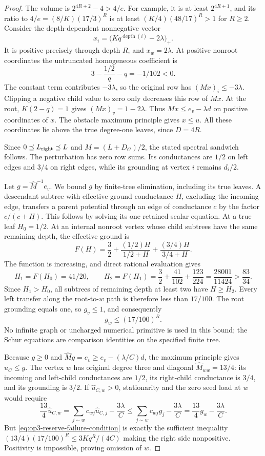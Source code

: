\begin{proof}
The volume is $2^{4R+2}-4>4/e$. For example, it is at least
$2^{4R+1}$, and its ratio to $4/e=(8/K)(17/3)^R$ is at least
$(K/4)(48/17)^R>1$ for $R\geq2$.
Consider the depth-dependent nonnegative vector
\[
 x_i=\bigl(Kq^{\operatorname{depth}(i)}-2\lambda\bigr)_+.
\]
It is positive precisely through depth $R$, and $x_w=2\lambda$.
At positive nonroot coordinates the untruncated homogeneous coefficient is
\[
 3-\frac{1/2}{q}-q=-1/102<0.
\]
The constant term contributes $-3\lambda$, so the original row has
$(Mx)_i\leq-3\lambda$. Clipping a negative child value to zero only
decreases this row of $Mx$. At the root, $K(2-q)=1$ gives
$(Mx)_v=1-2\lambda$. Thus $Mx\leq e_v-\lambda d$ on positive
coordinates of $x$. The obstacle maximum principle gives $x\leq u$.
All these coordinates lie above the true degree-one leaves, since $D=4R$.

Since $0\preceq L_{\rm right}\preceq L$ and
$M=(L+D_G)/2$, the stated spectral sandwich follows. The perturbation
has zero row sums. Its conductances are $1/2$ on left edges and $3/4$
on right edges, while its grounding at vertex $i$ remains $d_i/2$.

Let $g=\widehat M^{-1}e_v$. We bound $g$ by finite-tree elimination,
including its true leaves. A descendant subtree with effective ground
conductance $H$, excluding the incoming edge, transfers a parent
potential through an edge of conductance $c$ by the factor $c/(c+H)$.
This follows by solving its one retained scalar equation. At a true leaf
$H_0=1/2$. At an internal nonroot vertex whose child subtrees have the
same remaining depth, the effective ground is
\[
 F(H)=\frac32+\frac{(1/2)H}{1/2+H}+\frac{(3/4)H}{3/4+H}.
\]
The function is increasing, and direct rational evaluation gives
\[
 H_1=F(H_0)=41/20,\qquad
 H_2=F(H_1)=\frac32+\frac{41}{102}+\frac{123}{224}
 =\frac{28001}{11424}>\frac{83}{34}.
\]
Since $H_1>H_0$, all subtrees of remaining depth at least two have
$H\geq H_2$. Every left transfer along the root-to-$w$ path is therefore
less than $17/100$. The root grounding equals one, so $g_v\leq1$,
and consequently
\[
 g_w\leq(17/100)^R.
\]
No infinite graph or uncharged numerical primitive is used in this bound;
the Schur equations are comparison identities on the specified finite tree.

Because $g\geq0$ and $\widehat Mg=e_v\geq e_v-(\lambda/C)d$,
the maximum principle gives $\widehat u_C\leq g$.
The vertex $w$ has original degree three and diagonal
$\widehat M_{ww}=13/4$: its incoming and left-child conductances are
$1/2$, its right-child conductance is $3/4$, and its grounding is $3/2$.
If $\widehat u_{C,w}>0$, stationarity and the zero seed load at $w$
would require
\[
 \frac{13}{4}\widehat u_{C,w}
 =\sum_{j\sim w}c_{wj}\widehat u_{C,j}-\frac{3\lambda}{C}
 \leq\sum_{j\sim w}c_{wj}g_j-\frac{3\lambda}{C}
 =\frac{13}{4}g_w-\frac{3\lambda}{C}.
\]
But \cref{eq:op3-reserve-failure-condition} is exactly the sufficient
inequality $(13/4)(17/100)^R\leq3Kq^R/(4C)$ making the right side
nonpositive. Positivity is impossible, proving omission of $w$.


\end{proof}
